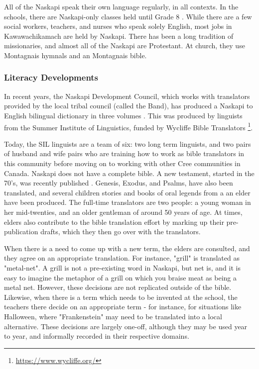 All of the Naskapi speak their own language regularly, in all contexts. In the schools, there are Naskapi-only classes held until Grade 8 \cite{llewellyn2017oral}. While there are a few social workers, teachers, and nurses who speak solely English, most jobs in Kawawachikamach are held by Naskapi. There has been a long tradition of missionaries, and almost all of the Naskapi are Protestant. At church, they use Montagnais hymnals and an Montagnais bible.

\subsubsection{Literacy Developments}
In recent years, the Naskapi Development Council, which works with translators provided by the local tribal council (called the Band), has produced a Naskapi to English bilingual dictionary in three volumes \cite{MacKenzie-and-Jancewicz-1994}. This was produced by linguists from the Summer Institute of Linguistics, funded by Wycliffe Bible Translators \footnote{\href{https://www.wycliffe.org/}{https://www.wycliffe.org/}}.

Today, the SIL linguists are a team of six: two long term linguists, and two pairs of husband and wife pairs who are training how to work as bible translators in this community before moving on to working with other Cree communities in Canada. Naskapi does not have a complete bible. A new testament, started in the 70's, was recently published \cite{naskapi-new-testament}. Genesis, Exodus, and Psalms, have also been translated, and several children stories and books of oral legends from a an elder have been produced. The full-time translators are two people: a young woman in her mid-twenties, and an older gentleman of around 50 years of age. At times, elders also contribute to the bible translation effort by marking up their pre-publication drafts, which they then go over with the translators.

When there is a need to come up with a new term, the elders are consulted, and they agree on an appropriate translation. For instance, "grill" is translated as "metal-net". A grill is not a pre-existing word in Naskapi, but net is, and it is easy to imagine the metaphor of a grill on which you braise meat as being a metal net. However, these decisions are not replicated outside of the bible. Likewise, when there is a term which needs to be invented at the school, the teachers there decide on an appropriate term - for instance, for situations like Halloween, where "Frankenstein" may need to be translated into a local alternative. These decisions are largely one-off, although they may be used year to year, and informally recorded in their respective domains.

